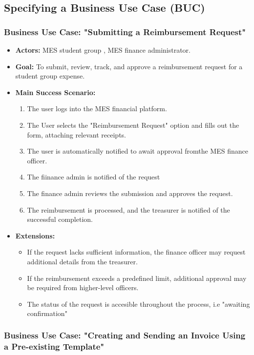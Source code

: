 \documentclass[12pt]{article}
\begin{document}
\subsection{Specifying a Business Use Case (BUC)}

\subsubsection{\textbf{Business Use Case:} "Submitting a Reimbursement Request"}
\begin{itemize}
    \item \textbf{Actors:} MES student group , MES finance administrator.
    \item \textbf{Goal:} To submit, review, track, and approve a reimbursement request for a student group expense.
    \item \textbf{Main Success Scenario:} 
    \begin{enumerate}
        \item The user logs into the MES financial platform.
        \item The User selects the "Reimbursement Request" option and fills out the form, attaching relevant receipts.
        \item The user is automatically notified to await approval fromthe MES finance officer.
        \item The fiinance admin is notified of the request
        \item The finance admin reviews the submission and approves the request.
        \item The reimbursement is processed, and the treasurer is notified of the successful completion.
    \end{enumerate}
    \item \textbf{Extensions:} 
    \begin{itemize}
        \item If the request lacks sufficient information, the finance officer may request additional details from the treasurer. 
        \item If the reimbursement exceeds a predefined limit, additional approval may be required from higher-level officers.
        \item The status of the request is accesible throughout the process, i.e "awaiting confirmation"
    \end{itemize}
\end{itemize}

\subsubsection{\textbf{Business Use Case:} "Creating and Sending an Invoice Using a Pre-existing Template"}
\end{document}
